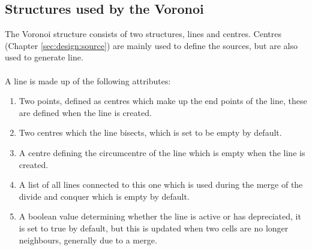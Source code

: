 \subsection{Structures used by the Voronoi}
The Voronoi structure consists of two structures, lines and centres. Centres (Chapter \ref{sec:design:source}) are mainly used to define the sources, but are also used to generate line.
\\
\\
A line is made up of the following attributes:
\begin{enumerate}
\item Two points, defined as centres which make up the end points of the line, these are defined when the line is created.
\item Two centres which the line bisects, which is set to be empty by default.
\item A centre defining the circumcentre of the line which is empty when the line is created.
\item A list of all lines connected to this one which is used during the merge of the divide and conquer which is empty by default.
\item A boolean value determining whether the line is active or has depreciated, it is set to true by default, but this is updated when two cells are no longer neighbours, generally due to a merge.
\end{enumerate}

